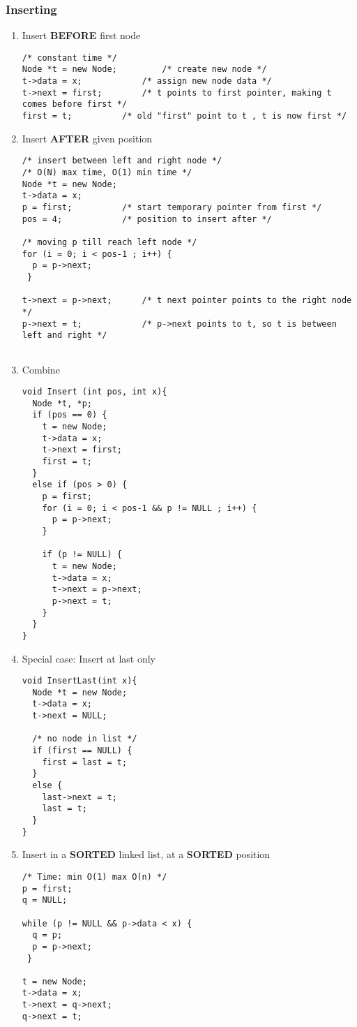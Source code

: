 \documentclass[11pt]{article}
\begin{document}
\subsubsection{Inserting}
\label{sec:org7da9388}
\begin{enumerate}
\item Insert \textbf{BEFORE} first node
\label{sec:org1e3d18a}
\begin{verbatim}
/* constant time */
Node *t = new Node; 		/* create new node */
t->data = x; 			/* assign new node data */
t->next = first; 		/* t points to first pointer, making t comes before first */
first = t; 			/* old "first" point to t , t is now first */
\end{verbatim}
\item Insert \textbf{AFTER} given position
\label{sec:orgef085c9}
\begin{verbatim}
/* insert between left and right node */
/* O(N) max time, O(1) min time */
Node *t = new Node;
t->data = x;
p = first; 			/* start temporary pointer from first */
pos = 4; 			/* position to insert after */

/* moving p till reach left node */
for (i = 0; i < pos-1 ; i++) {
  p = p->next;
 }

t->next = p->next;		/* t next pointer points to the right node */
p->next = t; 			/* p->next points to t, so t is between left and right */


\end{verbatim}
\item Combine
\label{sec:org4bf0b5e}
\begin{verbatim}
void Insert (int pos, int x){
  Node *t, *p;
  if (pos == 0) {
    t = new Node;
    t->data = x;
    t->next = first;
    first = t;
  }
  else if (pos > 0) {
    p = first;
    for (i = 0; i < pos-1 && p != NULL ; i++) {
      p = p->next;
    }

    if (p != NULL) {
      t = new Node;
      t->data = x;
      t->next = p->next;
      p->next = t;
    }
  }
}
\end{verbatim}
\item Special case: Insert at last only
\label{sec:orgc09ddd1}
\begin{verbatim}
void InsertLast(int x){
  Node *t = new Node;
  t->data = x;
  t->next = NULL;

  /* no node in list */
  if (first == NULL) {
    first = last = t;
  }
  else {
    last->next = t;
    last = t;
  }
}
\end{verbatim}
\item Insert in a \textbf{SORTED} linked list, at a \textbf{SORTED} position
\label{sec:org91552df}
\begin{verbatim}
/* Time: min O(1) max O(n) */
p = first;
q = NULL;

while (p != NULL && p->data < x) {
  q = p;
  p = p->next;
 }

t = new Node;
t->data = x;
t->next = q->next;
q->next = t;
\end{verbatim}
\end{enumerate}
\end{document}
